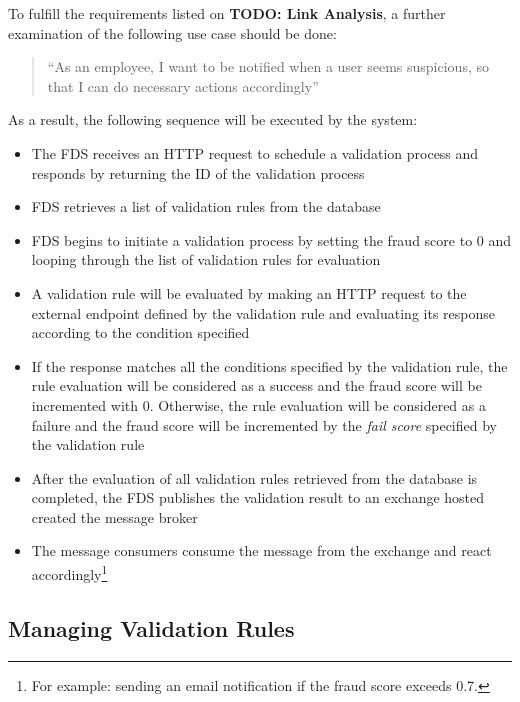 To fulfill the requirements listed on \textbf{TODO: Link Analysis}, a further examination of the following use case should be done:

\begin{quotation}
 \enquote{As an employee, I want to be notified when a user seems suspicious, so that I can do necessary actions accordingly} 
\end{quotation}

As a result, the following sequence will be executed by the system:

\begin{itemize}
 \item The FDS receives an HTTP request to schedule a validation process and responds by returning the ID of the validation process
 \item FDS retrieves a list of validation rules from the database
 \item FDS begins to initiate a validation process by setting the fraud score to 0 and looping through the list of validation rules for evaluation
 \item A validation rule will be evaluated by making an HTTP request to the external endpoint defined by the validation rule and evaluating its response according to the condition specified
 \item If the response matches all the conditions specified by the validation rule, the rule evaluation will be considered as a success and the fraud score will be incremented with 0. Otherwise, the rule evaluation will be considered as a failure and the fraud score will be incremented by the \emph{fail score} specified by the validation rule
 \item After the evaluation of all validation rules retrieved from the database is completed, the FDS publishes the validation result to an exchange hosted created the message broker
 \item The message consumers consume the message from the exchange and react accordingly\footnote{For example: sending an email notification if the fraud score exceeds 0.7.}
\end{itemize}

\subsection{Managing Validation Rules}
 \label{subsection:management}

